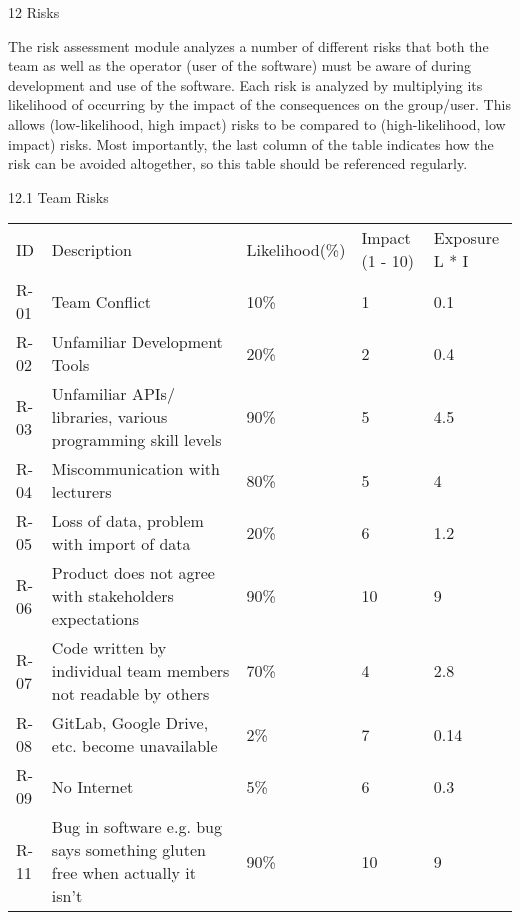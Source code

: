 12 Risks

The risk assessment module analyzes a number of different risks that both the team as well as the operator (user of the software) must be aware of during development and use of the software. Each risk is analyzed by multiplying its likelihood of occurring by the impact of the consequences on the group/user. This allows (low-likelihood, high impact) risks to be compared to (high-likelihood, low impact) risks. Most importantly, the last column of the table indicates how the risk can be avoided altogether, so this table should be referenced regularly.

12.1 Team Risks

\begin{tabularx}{\linewidth}{|X|X|X|X|X|}
    ID & Description & Likelihood(\%) & Impact (1 - 10) & Exposure L * I \\
    R-01 & Team Conflict & 10\% & 1 & 0.1 \\
    R-02 & Unfamiliar Development Tools & 20\% & 2 & 0.4 \\
    R-03 & Unfamiliar APIs/ libraries, various programming skill levels & 90\% & 5 & 4.5 \\
    R-04 & Miscommunication with lecturers & 80\% & 5 & 4 \\
    R-05 & Loss of data, problem with import of data & 20\% & 6 & 1.2 \\
    R-06 & Product does not agree with stakeholders expectations & 90\% & 10 & 9 \\
    R-07 & Code written by individual team members not readable by others & 70\% & 4 & 2.8 \\
    R-08 & GitLab, Google Drive, etc. become unavailable & 2\% & 7 & 0.14 \\
    R-09 & No Internet & 5\% & 6 & 0.3 \\
    R-11 & Bug in software e.g. bug says something gluten free when actually it isn’t & 90\% & 10 & 9 \\
\end{tabularx}


